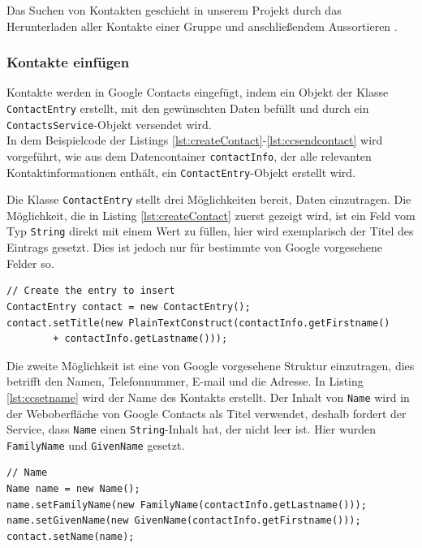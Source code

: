 Das Suchen von Kontakten geschieht in unserem Projekt durch das Herunterladen aller Kontakte
 einer Gruppe und anschließendem Aussortieren .

\FloatBarrier
\subsubsection{Kontakte einf\"ugen}
Kontakte werden in Google Contacts eingefügt, indem ein Objekt der Klasse
 \lstinline{ContactEntry} erstellt, mit den gewünschten Daten befüllt und durch ein
 \lstinline{ContactsService}-Objekt versendet wird.\\
In dem Beispielcode der Listings \ref{lst:createContact}-\ref{lst:ccsendcontact} wird
 vorgeführt, wie aus dem Datencontainer \lstinline{contactInfo}, der alle relevanten
  Kontaktinformationen enthält, ein \lstinline{ContactEntry}-Objekt erstellt wird.

Die Klasse \lstinline{ContactEntry} stellt drei Möglichkeiten bereit, Daten einzutragen.
Die Möglichkeit, die in Listing \ref{lst:createContact} zuerst gezeigt wird, ist ein Feld vom Typ
 \lstinline{String} direkt mit einem Wert zu füllen, hier wird exemplarisch der Titel des Eintrags
 gesetzt.
Dies ist jedoch nur für bestimmte von Google vorgesehene Felder so.

\begin{lstlisting}[float=h!t]
// Create the entry to insert
ContactEntry contact = new ContactEntry();
contact.setTitle(new PlainTextConstruct(contactInfo.getFirstname()
		+ contactInfo.getLastname()));
\end{lstlisting}

Die zweite Möglichkeit ist eine von Google vorgesehene Struktur einzutragen, dies betrifft den
 Namen, Telefonnummer, E-mail und die Adresse.
In Listing \ref{lst:ccsetname} wird der Name des Kontakts erstellt.
Der Inhalt von \lstinline{Name} wird in der Weboberfläche von Google Contacts als Titel verwendet,
 deshalb fordert der Service, dass \lstinline{Name} einen \lstinline{String}-Inhalt hat, der nicht
 leer ist.
Hier wurden \lstinline{FamilyName} und \lstinline{GivenName} gesetzt.

\begin{lstlisting}[float=h!t]
// Name
Name name = new Name();
name.setFamilyName(new FamilyName(contactInfo.getLastname()));
name.setGivenName(new GivenName(contactInfo.getFirstname()));
contact.setName(name);
\end{lstlisting}

